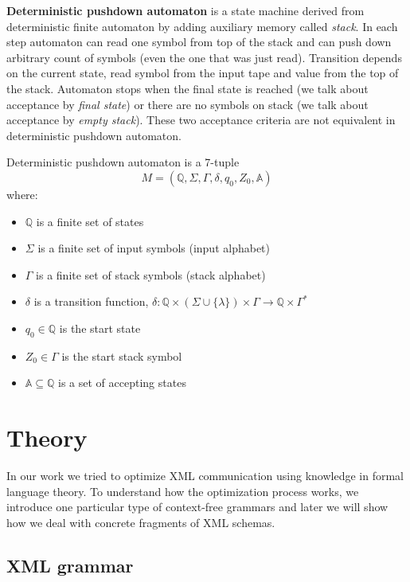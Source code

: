 \documentclass[12pt,notitlepage]{report}
\begin{document}
\textbf{Deterministic pushdown automaton} is a state machine derived from deterministic finite automaton by adding auxiliary memory called \textit{stack}. In each step automaton can read one symbol from top of the stack and can push down arbitrary count of symbols (even the one that was just read). Transition depends on the current state, read symbol from the input tape and value from the top of the stack. Automaton stops when the final state is reached (we talk about acceptance by \textit{final state}) or there are no symbols on stack (we talk about acceptance by \textit{empty stack}). These two acceptance criteria are not equivalent in deterministic pushdown automaton.

\begin{definition}
Deterministic pushdown automaton is a 7-tuple \[M = (\mathbb{Q}, \Sigma, \Gamma, \delta, q_{0}, Z_{0}, \mathbb{A})\] where:

\begin{itemize}
 \item $\mathbb{Q}$ is a finite set of states
 \item $\Sigma$ is a finite set of input symbols (input alphabet)
 \item $\Gamma$ is a finite set of stack symbols (stack alphabet)
 \item $\delta$ is a transition function,
   $\delta: \mathbb{Q} \times (\Sigma \cup \lbrace\lambda\rbrace) \times \Gamma \rightarrow \mathbb{Q} \times \Gamma^{*}$
 \item $q_{0} \in \mathbb{Q}$ is the start state
 \item $Z_{0} \in \Gamma$ is the start stack symbol
 \item $\mathbb{A} \subseteq \mathbb{Q}$ is a set of accepting states
\end{itemize}
\end{definition}

\chapter{Theory}
In our work we tried to optimize XML communication using knowledge in formal language theory. To understand how the optimization process works, we introduce one particular type of context-free grammars and later we will show how we deal with concrete fragments of XML schemas.

\section{XML grammar}
\label{xml-grammar}
\end{document}
